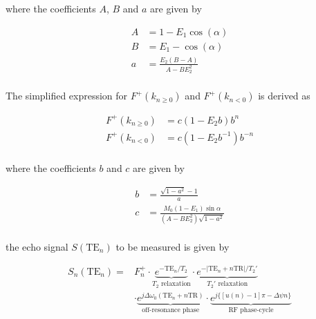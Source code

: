 \documentclass[AMA,STIX2COL,Linenumberson]{MRM}
\begin{document}
where the coefficients $A$, $B$ and $a$ are given by

\begin{equation}
 \begin{aligned}
    A &= 1 - E_1\cos(\alpha) \\
    B &= E_1 - \cos(\alpha) \\
    a &= \frac{E_2(B-A)}{A-BE_2^2} \\
  \end{aligned} 
\end{equation}

The simplified expression for $F^+(k_{n\ge 0})$ and $F^+(k_{n<0})$ is derived as

\begin{equation}
  \begin{aligned}
    F^+(k_{n\ge 0}) &= c(1-E_2b) b^{n}\\
    F^+(k_{n<0}) &= c(1-E_2b^{-1}) b^{-n}\\
  \end{aligned}
\end{equation}

where the coefficients $b$ and $c$ are given by

\begin{equation}
  \begin{aligned}
    b &= \frac{\sqrt{1-a^2}-1}{a} \\
    c &= \frac{M_0(1-E_1)\sin\alpha}{(A-BE_2^2)\sqrt{1-a^2}} \\
  \end{aligned}
\end{equation}

the echo signal $S(\text{TE}_n)$ to be measured is given by

\begin{equation}
  \begin{aligned}
    S_n(\text{TE}_n) =& F_n^+\cdot \underbrace{e^{-\text{TE}_n/T_2}}_{T_2\text{ relaxation}}\cdot \underbrace{e^{-\left|\text{TE}_n+n\text{TR}\right|/T_2'}}_{T_2'\text{ relaxation}}\\
    & \cdot \underbrace{e^{j\Delta\omega_0(\text{TE}_n+n\text{TR})}}_{\text{off-resonance phase}}\cdot\underbrace{e^{j\{[u(n)-1]\pi-\Delta\psi n\}}}_{\text{RF phase-cycle}}
  \end{aligned}
\end{equation}
\end{document}
